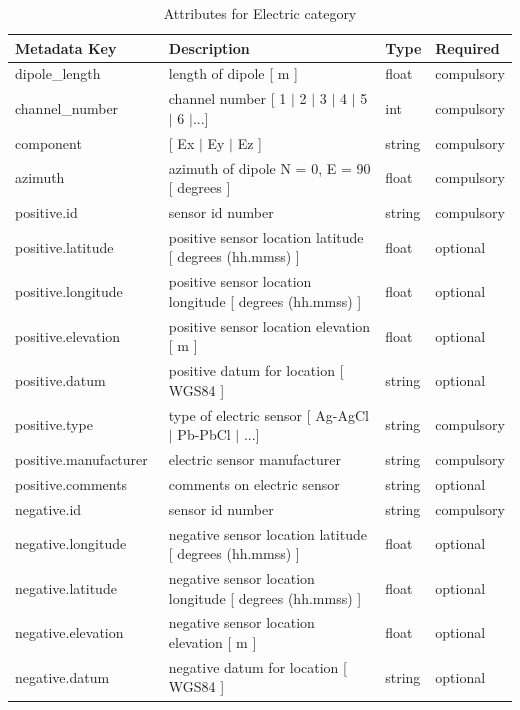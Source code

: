 \documentclass{article}
\begin{document}
\begin{table}[htb!]
    \caption[Attributes for Electric Channel]{Attributes for Electric category}
    \begin{tabular}{|l|p{3in}|l|l|}
        \hline
        \textbf{Metadata Key} & \textbf{Description} & \textbf{Type} & \textbf{Required} \\ \hline
        dipole\_length\ & length of dipole [ m ] & float & compulsory \\ \hline
        channel\_number\ & channel number [ 1 $|$ 2 $|$ 3 $|$ 4 $|$ 5 $|$ 6 $|$...] & int & compulsory \\ \hline
        component\ & [ Ex $|$ Ey $|$ Ez ] & string  & compulsory \\ \hline
        azimuth\ & azimuth of dipole N = 0,  E = 90 [ degrees ] & float & compulsory \\ \hline
        positive.id\ & sensor id number & string & compulsory \\ \hline
        positive.latitude\ & positive sensor location latitude [ degrees (hh.mmss) ] & float & optional \\ \hline
        positive.longitude\ & positive sensor location longitude [ degrees (hh.mmss) ] & float & optional \\ \hline
        positive.elevation\ & positive sensor location elevation [ m ] & float & optional \\ \hline
        positive.datum\ & positive datum for location [ WGS84 ] & string & optional \\ \hline
        positive.type\ & type of electric sensor [ Ag-AgCl $|$ Pb-PbCl $|$ ...] & string & compulsory \\ \hline
        positive.manufacturer\ & electric sensor manufacturer & string & compulsory \\ \hline
        positive.comments\ & comments on electric sensor & string & optional \\ \hline
        negative.id\ & sensor id number & string & compulsory \\ \hline
        negative.longitude\ & negative sensor location latitude [ degrees (hh.mmss) ] & float & optional \\ \hline
        negative.latitude\ & negative sensor location longitude [ degrees (hh.mmss) ] & float & optional \\ \hline
        negative.elevation\ & negative sensor location elevation [ m ] & float & optional \\ \hline
        negative.datum\ & negative datum for location [ WGS84 ] & string & optional \\ \hline

\end{tabular}
\end{table}
\end{document}
